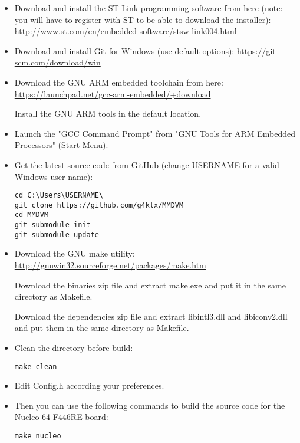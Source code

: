 \documentclass[]{article}
\begin{document}
\begin{itemize}[leftmargin=*]
\item Download and install the ST-Link programming software from here (note: you will have to register with ST to be able to download the installer): \url{http://www.st.com/en/embedded-software/stsw-link004.html}

\item Download and install Git for Windows (use default options):
\url{https://git-scm.com/download/win}

\item Download the GNU ARM embedded toolchain from here:
\url{https://launchpad.net/gcc-arm-embedded/+download}

Install the GNU ARM tools in the default location.

\item Launch the "GCC Command Prompt" from "GNU Tools for ARM Embedded Processors" (Start Menu).

\item Get the latest source code from GitHub (change USERNAME for a valid Windows user name):
\begin{lstlisting}[style=DOS]
cd C:\Users\USERNAME\
git clone https://github.com/g4klx/MMDVM
cd MMDVM
git submodule init
git submodule update
\end{lstlisting}

\item Download the GNU make utility:
\url{http://gnuwin32.sourceforge.net/packages/make.htm}

Download the binaries zip file and extract make.exe and put it in the same directory as Makefile.

Download the dependencies zip file and extract libintl3.dll and libiconv2.dll and put them in the same directory as Makefile.

\item Clean the directory before build:
\begin{lstlisting}[style=DOS]
make clean
\end{lstlisting}

\item Edit Config.h according your preferences.

\item Then you can use the following commands to build the source code for the Nucleo-64 F446RE board:
\begin{lstlisting}[style=DOS]
make nucleo
\end{lstlisting}


\end{itemize}
\end{document}
